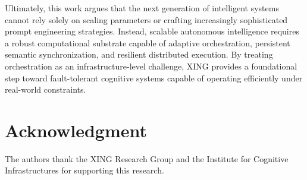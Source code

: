 \documentclass[conference]{IEEEtran}
\begin{document}
Ultimately, this work argues that the next generation of intelligent systems cannot rely solely on scaling parameters or crafting increasingly sophisticated prompt engineering strategies. Instead, scalable autonomous intelligence requires a robust computational substrate capable of adaptive orchestration, persistent semantic synchronization, and resilient distributed execution. By treating orchestration as an infrastructure-level challenge, XING provides a foundational step toward fault-tolerant cognitive systems capable of operating efficiently under real-world constraints.

\section*{Acknowledgment}
The authors thank the XING Research Group and the Institute for Cognitive Infrastructures for supporting this research.

\balance


\end{document}
